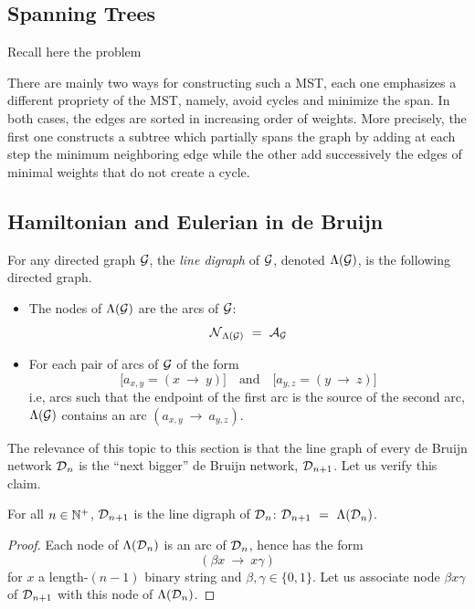 {\subsection{Spanning Trees}

Recall here the problem
\bigskip

There are mainly two ways for constructing such a MST, each one
emphasizes a different propriety of the MST, namely, avoid cycles and
minimize the span.  In both cases, the edges are sorted in increasing
order of weights.  More precisely, the first one constructs a subtree
which partially spans the graph by adding at each step the minimum
neighboring edge while the other add successively the edges of minimal
weights that do not create a cycle.

\subsection{Hamiltonian and Eulerian in de Bruijn}


%
For any directed graph $\mbox{$\cal G$}$, the {\it line digraph} 
 of $\mbox{$\cal G$}$, denoted $\Lambda(\mbox{$\cal G$})$, is the following
directed graph.
\begin{itemize}
\item
The nodes of $\Lambda(\mbox{$\cal G$})$ are the arcs of $\mbox{$\cal G$}$:
\[ \n_{{\Lambda}({\cal G})} \ = \ \a_{\fg} \]
\item
For each pair of arcs of $\mbox{$\cal G$}$ of the form
\[ \big[a_{x,y} = (x \ \rightarrow \ y) \big] \ \ \ \mbox{ and } \ \ \ 
\big[a_{y,z} = (y \ \rightarrow \ z) \big]
\]
i.e, arcs such that the endpoint of the first arc is the source of the
second arc, $\Lambda(\mbox{$\cal G$})$ contains an arc $(a_{x,y} \ \rightarrow
\ a_{y,z})$.
\end{itemize}
The relevance of this topic to this section is that the line graph of
every de Bruijn network $\mbox{$\cal D$}_n$ is the ``next bigger'' de Bruijn
network, $\mbox{$\cal D$}_{n+1}$.  Let us verify this claim.

\begin{prop}
\label{thm:deBruin-linegraph}
For all $n \in \mathbb{N}^+$,
$\mbox{$\cal D$}_{n+1}$ is the line digraph of $\mbox{$\cal D$}_n$: $\d_{n+1} \ = \ \Lambda(\d_n)$.
\end{prop}

\begin{proof}
Each node of $\Lambda(\mbox{$\cal D$}_n)$ is an arc of $\mbox{$\cal D$}_n$, hence has the form
\[ (\beta x \ \rightarrow \ x \gamma) \]
for $x$ a length-$(n-1)$ binary string and $\beta, \gamma \in
\{0,1\}$.  Let us associate node $\beta x \gamma$ of $\mbox{$\cal D$}_{n+1}$ with
this node of $\Lambda(\mbox{$\cal D$}_n)$.


\end{proof}}
